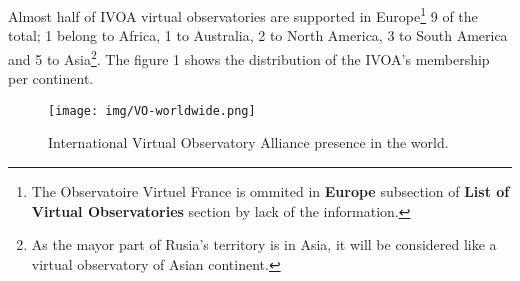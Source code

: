 Almost half of IVOA virtual observatories are supported in Europe\footnote{The
Observatoire Virtuel France is ommited in \textbf{Europe} subsection of
\textbf{List of Virtual Observatories} section by lack of the information.} 9 of
the total; 1 belong to Africa, 1 to Australia, 2 to North America, 3 to South
America and 5 to Asia\footnote{As the mayor part of Rusia's territory is in
Asia, it will be considered like a virtual observatory of Asian continent.}. The
figure 1 shows the distribution of the IVOA's membership per continent.\\


\begin{figure}%
\begin{center}
	\texttt{[image: img/VO-worldwide.png]}
	\caption{International Virtual Observatory Alliance presence in the world.}
\end{center}
\end{figure}





